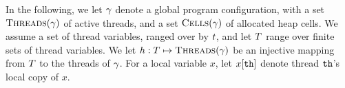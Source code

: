 In the following, we let $\gamma$ denote a global program configuration,
with a set $\mbox{\sc Threads}(\gamma)$ of active threads, and a set
$\mbox{\sc Cells}(\gamma)$ of allocated heap cells.
We assume a set of thread variables, ranged over by $t$, and
let $T$ range over finite sets of thread variables.
We let $h:T \mapsto \mbox{\sc Threads}(\gamma)$ be an injective mapping
from $T$ to the threads of $\gamma$.
For a local variable $x$, let $x[{\tt th}]$ denote thread
${\tt th}$'s local copy of $x$.


